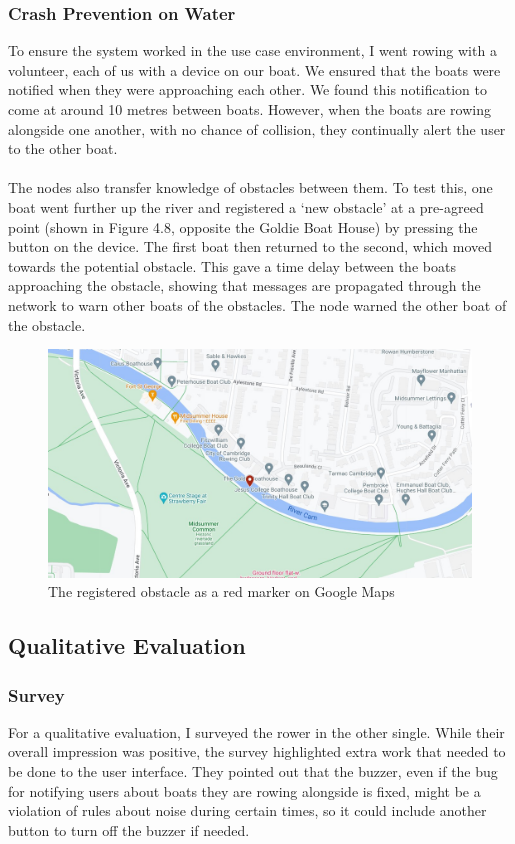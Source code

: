 \documentclass[12pt,a4paper]{report}
\begin{document}
\subsubsection{Crash Prevention on Water}
To ensure the system worked in the use case environment, I went rowing with a volunteer, each of us with a device on our boat. We ensured that the boats were notified when they were approaching each other. We found this notification to come at around 10 metres between boats. However, when the boats are rowing alongside one another, with no chance of collision, they continually alert the user to the other boat. \\ \\ 
The nodes also transfer knowledge of obstacles between them. To test this, one boat went further up the river and registered a `new obstacle' at a pre-agreed point (shown in Figure 4.8, opposite the Goldie Boat House) by pressing the button on the device. The first boat then returned to the second, which moved towards the potential obstacle. This gave a time delay between the boats approaching the obstacle, showing that messages are propagated through the network to warn other boats of the obstacles. The node warned the other boat of the obstacle. 
\begin{figure}[h]
\begin{center}
\includegraphics[scale=0.3]{obstacle.jpg}
\end{center}
\caption{The registered obstacle as a red marker on Google Maps \cite{googlemapsgeneral}}
\end{figure}

\subsection{Qualitative Evaluation}
\subsubsection{Survey}
For a qualitative evaluation, I surveyed the rower in the other single. While their overall impression was positive, the survey highlighted extra work that needed to be done to the user interface. They pointed out that the buzzer, even if the bug for notifying users about boats they are rowing alongside is fixed, might be a violation of rules about noise during certain times, so it could include another button to turn off the buzzer if needed.
\end{document}
